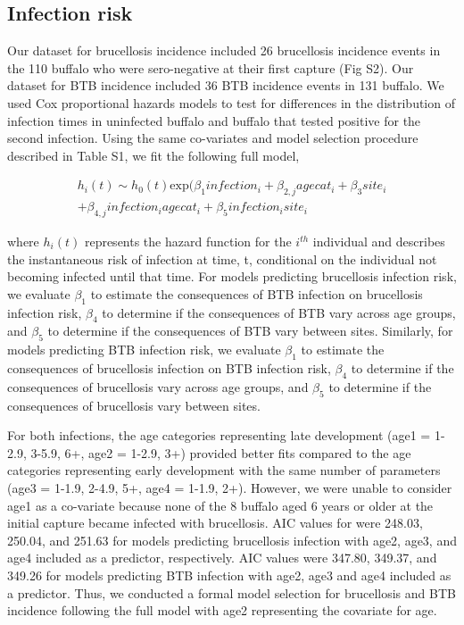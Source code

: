 \documentclass[10pt,letterpaper]{article}
\begin{document}
\pagebreak

\subsection*{Infection risk}
Our dataset for brucellosis incidence included 26 brucellosis incidence events in the 110 buffalo who were sero-negative at their first capture (Fig S2). Our dataset for BTB incidence included 36 BTB incidence events in 131 buffalo. We used Cox proportional hazards models to test for differences in the distribution of infection times in uninfected buffalo and buffalo that tested positive for the second infection. Using the same co-variates and model selection procedure described in Table S1, we fit the following full model,

\begin{gather*}
h_{i}(t) \sim h_{0}(t) \text{exp} (\beta_{1} infection_i + \beta_{2,j} agecat_i + \beta_3 site_i \\
+ \beta_{4,j} infection_i agecat_i + \beta_{5} infection_i site_i 
\end{gather*}

where $h_{i}(t)$ represents the hazard function for the $i^{th}$ individual and describes the instantaneous risk of infection at time, t, conditional on the individual not becoming infected until that time. For models predicting brucellosis infection risk, we evaluate $\beta_1$ to estimate the consequences of BTB infection on brucellosis infection risk, $\beta_4$ to determine if the consequences of BTB vary across age groups, and $\beta_5$ to determine if the consequences of BTB vary between sites. Similarly, for models predicting BTB infection risk, we evaluate $\beta_1$ to estimate the consequences of brucellosis infection on BTB infection risk, $\beta_4$ to determine if the consequences of brucellosis vary across age groups, and $\beta_5$ to determine if the consequences of brucellosis vary between sites.

For both infections, the age categories representing late development (age1 = 1-2.9, 3-5.9, 6+, age2 = 1-2.9, 3+) provided better fits compared to the age categories representing early development with the same number of parameters (age3 = 1-1.9, 2-4.9, 5+, age4 = 1-1.9, 2+). However, we were unable to consider age1 as a co-variate because none of the 8 buffalo aged 6 years or older at the initial capture became infected with brucellosis.  AIC values for were 248.03, 250.04, and 251.63 for models predicting brucellosis infection with age2, age3, and age4 included as a predictor, respectively. AIC values were 347.80, 349.37, and 349.26 for models predicting BTB infection with age2, age3 and age4 included as a predictor. Thus, we conducted a formal model selection for brucellosis and BTB incidence following the full model with age2 representing the covariate for age. 
\end{document}
